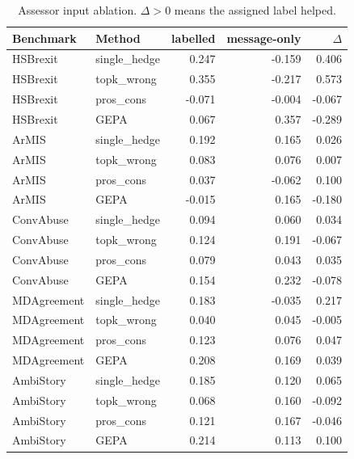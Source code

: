 \begin{table}[t]
\centering
\small
\begin{tabular}{llrrr}
\hline
Benchmark & Method & labelled & message-only & $\Delta$ \\
\hline
HSBrexit & single\_hedge & 0.247 & -0.159 & 0.406 \\
HSBrexit & topk\_wrong & 0.355 & -0.217 & 0.573 \\
HSBrexit & pros\_cons & -0.071 & -0.004 & -0.067 \\
HSBrexit & GEPA & 0.067 & 0.357 & -0.289 \\
ArMIS & single\_hedge & 0.192 & 0.165 & 0.026 \\
ArMIS & topk\_wrong & 0.083 & 0.076 & 0.007 \\
ArMIS & pros\_cons & 0.037 & -0.062 & 0.100 \\
ArMIS & GEPA & -0.015 & 0.165 & -0.180 \\
ConvAbuse & single\_hedge & 0.094 & 0.060 & 0.034 \\
ConvAbuse & topk\_wrong & 0.124 & 0.191 & -0.067 \\
ConvAbuse & pros\_cons & 0.079 & 0.043 & 0.035 \\
ConvAbuse & GEPA & 0.154 & 0.232 & -0.078 \\
MDAgreement & single\_hedge & 0.183 & -0.035 & 0.217 \\
MDAgreement & topk\_wrong & 0.040 & 0.045 & -0.005 \\
MDAgreement & pros\_cons & 0.123 & 0.076 & 0.047 \\
MDAgreement & GEPA & 0.208 & 0.169 & 0.039 \\
AmbiStory & single\_hedge & 0.185 & 0.120 & 0.065 \\
AmbiStory & topk\_wrong & 0.068 & 0.160 & -0.092 \\
AmbiStory & pros\_cons & 0.121 & 0.167 & -0.046 \\
AmbiStory & GEPA & 0.214 & 0.113 & 0.100 \\
\hline
\end{tabular}
\caption{Assessor input ablation. $\Delta>0$ means the assigned label helped.}
\label{tab:ablation}
\end{table}